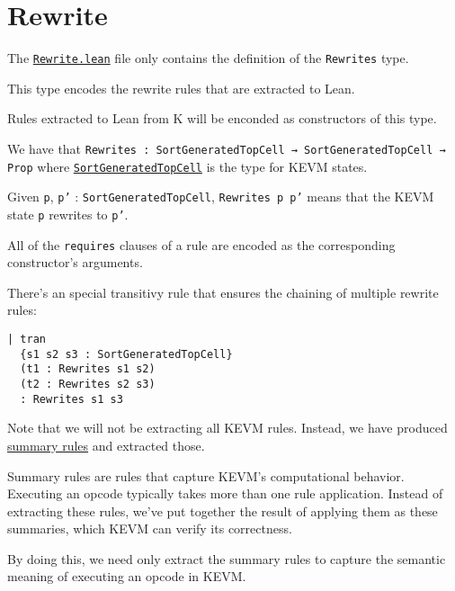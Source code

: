 \section{Rewrite}
The
\href{https://github.com/runtimeverification/evm-equivalence/blob/master/EvmEquivalence/KEVM2Lean/Rewrite.lean}{\texttt{Rewrite.lean}}
file only contains the definition of the \texttt{Rewrites} type.

This type encodes the rewrite rules that are extracted to Lean.

\begin{definition}[Rewrites]\label{def:Rewrites}\leanok

Rules extracted to Lean from K will be enconded as constructors of this type.

We have that \texttt{Rewrites : SortGeneratedTopCell → SortGeneratedTopCell →
  Prop} where
\href{https://runtimeverification.github.io/evm-equivalence/docs/EvmEquivalence/KEVM2Lean/Sorts.html#SortGeneratedTopCell}{\texttt{SortGeneratedTopCell}}
is the type for KEVM states.

Given \texttt{p}, \texttt{p'} : \texttt{SortGeneratedTopCell}, \texttt{Rewrites
  p p'} means that the KEVM state \texttt{p} rewrites to \texttt{p'}.

All of the \texttt{requires} clauses of a rule are encoded as the corresponding constructor's arguments.

There's an special transitivy rule that ensures the chaining of multiple rewrite
rules:

\begin{verbatim}
| tran
  {s1 s2 s3 : SortGeneratedTopCell}
  (t1 : Rewrites s1 s2)
  (t2 : Rewrites s2 s3)
  : Rewrites s1 s3
\end{verbatim}

\end{definition}

Note that we will not be extracting all KEVM rules. Instead, we have produced
\href{https://github.com/runtimeverification/evm-semantics/tree/master/kevm-pyk/src/kevm_pyk/kproj/evm-semantics/summaries}{summary
  rules} and extracted those.

Summary rules are rules that capture KEVM's computational behavior. Executing an
opcode typically takes more than one rule application. Instead of extracting
these rules, we've put together the result of applying them as these summaries,
which KEVM can verify its correctness.

By doing this, we need only extract the summary rules to capture the semantic
meaning of executing an opcode in KEVM.
